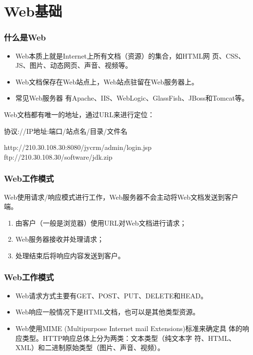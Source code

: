 \section{Web基础}

\begin{frame}[fragile]
  \frametitle{什么是Web}

  \begin{itemize}
  \item Web本质上就是Internet上所有文档（资源）的集合，如HTML网
    页、CSS、JS、图片、动态网页、声音、视频等。
  \item Web文档保存在Web站点上，Web站点驻留在Web服务器上。
  \item 常见Web服务器
    有Apache、IIS、WebLogic、GlassFish、JBoss和Tomcat等。
  \end{itemize}
  Web文档都有唯一的地址，通过URL来进行定位：

  {\Blue\kai 协议://IP地址:端口/站点名/目录/文件名}

  \begin{javaCode}
    http://210.30.108.30:8080/jycrm/admin/login.jsp
    ftp://210.30.108.30/software/jdk.zip
  \end{javaCode}
\end{frame}

\begin{frame}
  \frametitle{Web工作模式} 

  Web使用请求/响应模式进行工作，Web服务器不会主动将Web文档发送到客户端。

  \begin{enumerate}\kai
  \item 由客户（一般是浏览器）使用URL对Web文档进行请求；
  \item Web服务器接收并处理请求；
  \item 处理结束后将响应内容发送到客户。
  \end{enumerate}

\end{frame}

\begin{frame}
  \frametitle{Web工作模式} 
  
  \begin{itemize}
  \item Web请求方式主要有{\Red GET、POST}、PUT、DELETE和HEAD。
  \item Web响应一般情况下是HTML文档，也可以是其他类型资源。
  \item Web使用MIME (Multipurpose Internet mail Extensions)标准来确定具
    体的响应类型。HTTP响应总体上分为两类：文本类型（纯文本字
    符、HTML、XML）和二进制原始类型（图片、声音、视频）。
  \end{itemize}
\end{frame}

